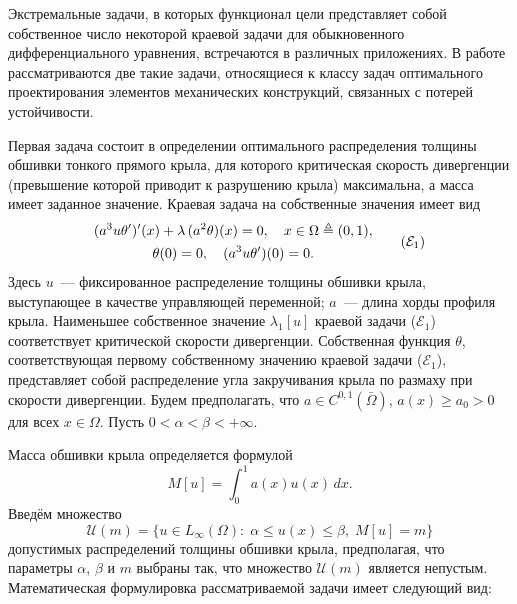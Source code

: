 \vzmscaption



\par
Экстремальные задачи, в которых функционал цели
\linebreak
представляет
собой собственное число
некоторой краевой задачи для обыкновенного дифференциального уравнения,
встречаются в различных приложениях.
%
%
%
В работе рассматриваются две такие задачи, относящиеся к классу задач оптимального проектирования
элементов механических конструкций, связанных с потерей устойчивости.
%
%
%
%
%
\par
Первая задача состоит в определении оптимального распределения толщины обшивки тонкого прямого
крыла,
для которого критическая скорость дивергенции
(превышение которой приводит к разрушению крыла)
максимальна, а масса имеет заданное значение.
%
%
%
Краевая задача на собственные значения имеет вид
\[
\begin{gathered}
(a^3 u \theta')'(x) + \lambda \, (a^2 \theta)(x) = 0,
\quad
x \in \Omega \triangleq (0, 1),
\\
\theta(0) = 0,
\quad
(a^3 u \theta')(0) = 0.
\end{gathered}
\tag{$\mathcal{E}_1$}
\]
Здесь
$u$~--- фиксированное распределение толщины обшивки крыла,
выступающее в качестве управляющей переменной;
$a$~--- длина хорды профиля крыла.
%
%
%
Наименьшее собственное значение $\lambda_1[u]$ краевой задачи
($\mathcal{E}_1$)
соответствует критической
скорости дивергенции.
%
%
%
Собственная функция $\theta$,
соответствующая первому собственному
значению краевой задачи
($\mathcal{E}_1$),
представляет собой распределение угла закручивания крыла по
размаху при скорости дивергенции.
%
%
%
Будем предполагать,
что
$a \in C^{0, 1}(\bar{\Omega})$, $a(x) \geq a_0 > 0$ для всех $x \in \Omega$.
%
%
%
Пусть
$0 < \alpha < \beta < +\infty$.
%
%
%
%
%
\par
Масса обшивки крыла определяется формулой
\[
M[u] = \int_0^1 a(x) u(x) \, dx.
\]
Введём множество
\[
\mathcal{U}(m)
=
\{
u \in L_\infty(\Omega) :
\;
\alpha \leq u(x) \leq \beta,
\;
M[u] = m
\}
\]
допустимых распределений толщины обшивки крыла,
предполагая, что параметры $\alpha$, $\beta$ и $m$
выбраны так, что множество $\mathcal{U}(m)$ является непустым.
%
%
%
Математическая формулировка рассматриваемой задачи имеет следующий вид:
